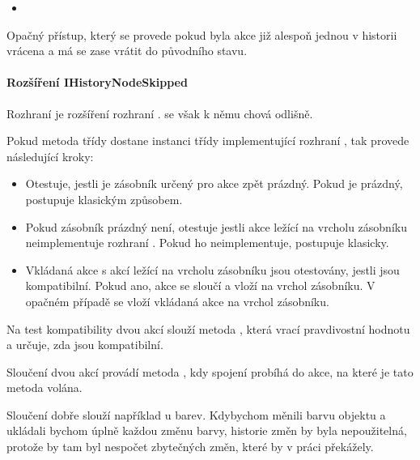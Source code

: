 \documentclass[
  field=inf,
  biblatex=false,
  glossaries,
  index
]{kidiplom}
\begin{document}
\begin{itemize}
\item {}
\end{itemize}
Opačný přístup, který se provede pokud byla akce již alespoň jednou v historii vrácena a má se zase vrátit do původního stavu.

\paragraph{Rozšíření IHistoryNodeSkipped}
Rozhraní  je rozšíření rozhraní .  se však k němu chová odlišně.

Pokud metoda  třídy  dostane instanci třídy implementující rozhraní , tak provede následující kroky:

\begin{itemize}
\item Otestuje, jestli je zásobník určený pro akce zpět prázdný. Pokud je prázdný, postupuje klasickým způsobem.
\item Pokud zásobník prázdný není, otestuje jestli akce ležící na vrcholu zásobníku neimplementuje rozhraní . Pokud ho neimplementuje, postupuje klasicky.
\item Vkládaná akce s akcí ležící na vrcholu zásobníku jsou otestovány, jestli jsou kompatibilní. Pokud ano, akce se sloučí a vloží na vrchol zásobníku. V opačném případě se vloží vkládaná akce na vrchol zásobníku.
\end{itemize}

Na test kompatibility dvou akcí  slouží metoda , která vrací pravdivostní hodnotu a určuje, zda jsou kompatibilní.

Sloučení dvou akcí provádí metoda , kdy spojení probíhá do akce, na které je tato metoda volána.

Sloučení dobře slouží například u barev. Kdybychom měnili barvu objektu a ukládali bychom úplně každou změnu barvy, historie změn by byla nepoužitelná, protože by tam byl nespočet zbytečných změn, které by v práci překážely.
\end{document}
